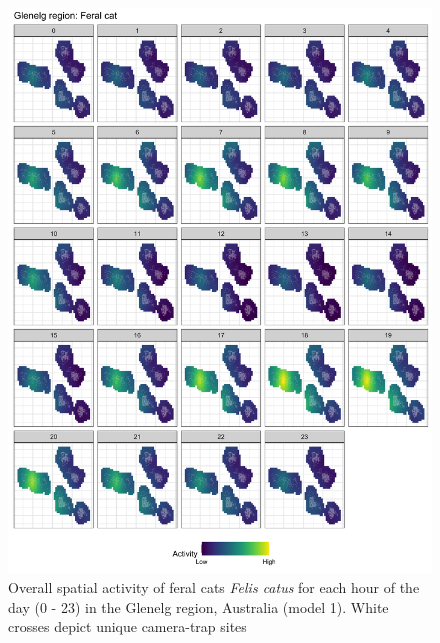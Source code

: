 \documentclass[]{elsarticle} %
\begin{document}
\begin{figure}

{\centering \includegraphics[width=1\linewidth]{../figs/spte_facet_g_cat} 

}

\caption{Overall spatial activity of feral cats \textit{Felis catus} for each hour of the day (0 - 23) in the Glenelg region, Australia (model 1). White crosses depict unique camera-trap sites}\label{fig:diel-space-g-cat}
\end{figure}

\newpage
\end{document}
